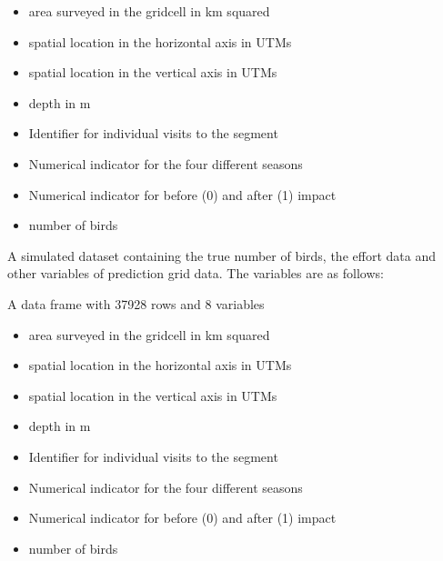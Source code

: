 \documentclass[a4paper]{book}
\begin{document}
\begin{Details}\relax
\begin{itemize}

\item {} area surveyed in the gridcell in km squared
\item {} spatial location in the horizontal axis in UTMs
\item {} spatial location in the vertical axis in UTMs
\item {} depth in m
\item {} Identifier for individual visits to the segment
\item {} Numerical indicator for the four different seasons
\item {} Numerical indicator for before (0) and after (1) impact
\item {} number of birds

\end{itemize}

\end{Details}
%
\begin{Description}\relax
A simulated dataset containing the true number of birds, the effort data and other variables of 
prediction grid data. The variables are as follows:
\end{Description}
%
\begin{Format}
A data frame with 37928 rows and 8 variables
\end{Format}
%
\begin{Details}\relax
\begin{itemize}

\item {} area surveyed in the gridcell in km squared
\item {} spatial location in the horizontal axis in UTMs
\item {} spatial location in the vertical axis in UTMs
\item {} depth in m
\item {} Identifier for individual visits to the segment
\item {} Numerical indicator for the four different seasons
\item {} Numerical indicator for before (0) and after (1) impact
\item {} number of birds

\end{itemize}

\end{Details}
\end{document}
